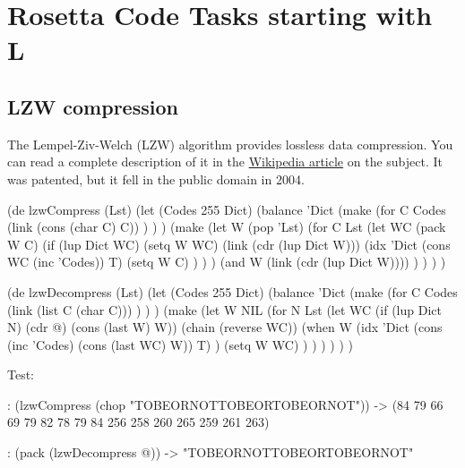 %
%
%

\chapter{Rosetta Code Tasks starting with L}

\section*{LZW compression}

The Lempel-Ziv-Welch (LZW) algorithm provides lossless data compression.
You can read a complete description of it in the
\href{http://en.wikipedia.org/wiki/Lempel-Ziv-Welch}{Wikipedia article}
on the subject. It was patented, but it fell in the public domain in
2004.


\begin{wideverbatim}

(de lzwCompress (Lst)
   (let (Codes 255  Dict)
      (balance 'Dict
         (make
            (for C Codes
               (link (cons (char C) C)) ) ) )
      (make
         (let W (pop 'Lst)
            (for C Lst
               (let WC (pack W C)
                  (if (lup Dict WC)
                     (setq W WC)
                     (link (cdr (lup Dict W)))
                     (idx 'Dict (cons WC (inc 'Codes)) T)
                     (setq W C) ) ) )
            (and W (link (cdr (lup Dict W)))) ) ) ) )

(de lzwDecompress (Lst)
   (let (Codes 255  Dict)
      (balance 'Dict
         (make
            (for C Codes
               (link (list C (char C))) ) ) )
      (make
         (let W NIL
            (for N Lst
               (let WC (if (lup Dict N) (cdr @) (cons (last W) W))
                  (chain (reverse WC))
                  (when W
                     (idx 'Dict (cons (inc 'Codes) (cons (last WC) W)) T) )
                  (setq W WC) ) ) ) ) ) )

Test:

: (lzwCompress (chop "TOBEORNOTTOBEORTOBEORNOT"))
-> (84 79 66 69 79 82 78 79 84 256 258 260 265 259 261 263)

: (pack (lzwDecompress @))
-> "TOBEORNOTTOBEORTOBEORNOT"

\end{wideverbatim}

